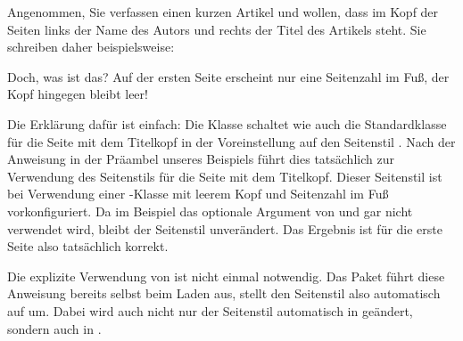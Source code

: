 \begin{Example}
  Angenommen, Sie verfassen einen kurzen Artikel und wollen, dass im Kopf der
  Seiten links der Name des Autors und rechts der Titel des Artikels
  steht. Sie schreiben daher beispielsweise:%
  {}%
  Doch, was ist das? Auf der ersten Seite erscheint nur eine Seitenzahl im
  Fuß, der Kopf hingegen bleibt leer!

  Die Erklärung dafür ist einfach: Die Klasse  schaltet wie
  auch die Standardklasse  für die Seite mit dem Titelkopf in
  der Voreinstellung auf den Seitenstil . Nach der Anweisung
   in der Präambel
  unseres Beispiels führt dies tatsächlich zur Verwendung des Seitenstils
   für die Seite mit dem
  Titelkopf. Dieser Seitenstil ist bei Verwendung einer \KOMAScript-Klasse mit
  leerem Kopf und Seitenzahl im Fuß vorkonfiguriert. Da im Beispiel das
  optionale Argument von  und  gar nicht verwendet
  wird, bleibt der Seitenstil 
  unverändert. Das Ergebnis ist für die erste Seite also tatsächlich korrekt.

  Die explizite Verwendung von
   ist nicht einmal
  notwendig. Das Paket führt diese Anweisung bereits selbst beim Laden aus,
  stellt den Seitenstil also automatisch auf
  um. Dabei wird auch nicht nur der Seitenstil
   automatisch in
   geändert, sondern auch
   in
  .


\end{Example}
